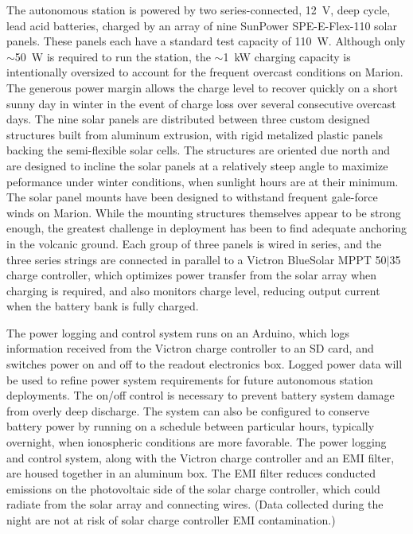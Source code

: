 \documentclass{ws-jai}
\begin{document}
The autonomous station is powered by two series-connected, 12~V, deep
cycle, lead acid batteries, charged by an array of nine SunPower
SPE-E-Flex-110 solar panels. These panels each have a standard test
capacity of 110~W. Although only $\sim$50~W is required to run the
station, the $\sim$1~kW charging capacity is intentionally oversized
to account for the frequent overcast conditions on Marion.  The
generous power margin allows the charge level to recover quickly on a
short sunny day in winter in the event of charge loss over several
consecutive overcast days.  The nine solar panels are distributed
between three custom designed structures built from aluminum
extrusion, with rigid metalized plastic panels backing the
semi-flexible solar cells. The structures are oriented due north and
are designed to incline the solar panels at a relatively steep angle
to maximize peformance under winter conditions, when sunlight hours
are at their minimum. The solar panel mounts have been designed to
withstand frequent gale-force winds on Marion. While the mounting
structures themselves appear to be strong enough, the greatest
challenge in deployment has been to find adequate anchoring in the
volcanic ground.  Each group of three panels is wired in series, and
the three series strings are connected in parallel to a Victron
BlueSolar MPPT 50$\vert$35 charge controller, which optimizes power
transfer from the solar array when charging is required, and also
monitors charge level, reducing output current when the battery bank
is fully charged.

The power logging and control system runs on an Arduino, which logs
information received from the Victron charge controller to an SD card,
and switches power on and off to the readout electronics box. Logged
power data will be used to refine power system requirements for future
autonomous station deployments. The on/off control is necessary to
prevent battery system damage from overly deep discharge. The system
can also be configured to conserve battery power by running on a
schedule between particular hours, typically overnight, when
ionospheric conditions are more favorable.  The power logging and
control system, along with the Victron charge controller and an EMI
filter, are housed together in an aluminum box. The EMI filter reduces
conducted emissions on the photovoltaic side of the solar charge
controller, which could radiate from the solar array and connecting
wires. (Data collected during the night are not at risk of solar
charge controller EMI contamination.)
\end{document}
